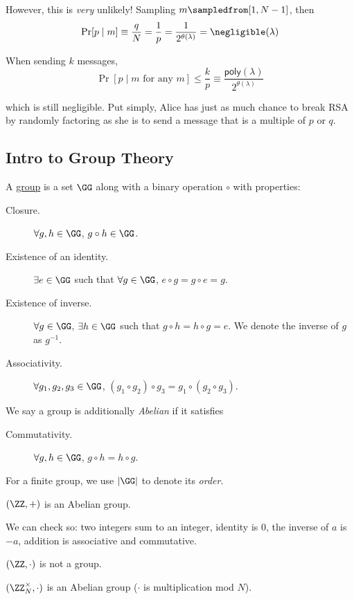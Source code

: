 However, this is \emph{very} unlikely! Sampling $m\sampledfrom [1, N-1]$, then
\[\Pr[p\mid m] \equiv \frac{q}{N} = \frac{1}{p} = \frac{1}{2^{\theta(\lambda)}}=\negligible(\lambda)\]

When sending $k$ messages,
\[\Pr[p\mid m\text{ for any }m] \leq \frac{k}{p} \equiv \frac{\mathsf{poly}(\lambda)}{2^{\theta(\lambda)}}\]

which is still negligible. Put simply, Alice has just as much chance to break RSA by randomly factoring as she is to send a message that is a multiple of $p$ or $q$.

\subsection{Intro to Group Theory}
\begin{definition}[Group]
    A \ul{group} is a set $\GG$ along with a binary operation $\circ$ with properties:
    \begin{description}
        \item[Closure.] $\forall g, h\in \GG$, $g\circ h\in \GG$.
        \item[Existence of an identity.] $\exists e\in \GG$ such that $\forall g\in \GG$, $e\circ g = g\circ e = g$.
        \item[Existence of inverse.] $\forall g\in \GG$, $\exists h\in \GG$ such that $g\circ h = h\circ g = e$. We denote the inverse of $g$ as $g^{-1}$.
        \item[Associativity.] $\forall g_1, g_2, g_3\in \GG$, $(g_1\circ g_2)\circ g_3 = g_1\circ(g_2\circ g_3)$.
    \end{description}

    We say a group is additionally \emph{Abelian} if it satisfies
    \begin{description}
        \item[Commutativity.] $\forall g, h\in \GG$, $g\circ h = h \circ g$.
    \end{description}
    For a finite group, we use $|\GG|$ to denote its \emph{order}.
\end{definition}
\begin{example}
    $(\ZZ, +)$ is an Abelian group.

    We can check so: two integers sum to an integer, identity is $0$, the inverse of $a$ is $-a$, addition is associative and commutative.

    $(\ZZ, \cdot)$ is not a group.

    $(\ZZ_N^\times, \cdot)$ is an Abelian group ($\cdot$ is multiplication mod $N$).
\end{example}

